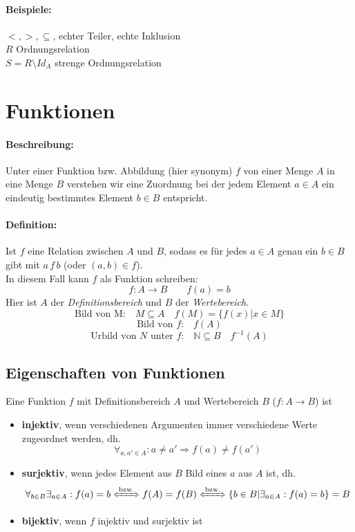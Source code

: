 \documentclass[10pt,a4paper]{article}
\begin{document}
\paragraph{Beispiele:}$<,>,\subseteq$, \glqq echter Teiler\grqq , \glqq echte Inklusion\grqq
\ \\
$R$ Ordnungsrelation\\
$S=R\setminus Id_A$ strenge Ordnungsrelation

\section{Funktionen}
\paragraph{Beschreibung:}Unter einer Funktion bzw. Abbildung (hier synonym) $f$ von einer Menge $A$ in eine Menge $B$ verstehen wir eine Zuordnung bei der jedem Element $a\in A$ ein eindeutig bestimmtes Element $b\in B$ entspricht.
\paragraph{Definition:}Ist $f$ eine Relation zwischen $A$ und $B$, sodass es für jedes $a\in A$ genau ein $b\in B$ gibt mit $a\, f\, b$ (oder $(a,b)\in f$).\\
In diesem Fall kann $f$ als Funktion schreiben:
\[
f:A\rightarrow B \qquad f(a)=b
\]
Hier ist $A$ der \emph{Definitionsbereich} und $B$ der \emph{Wertebereich}.
\[
\text{Bild von M:} \quad M\subseteq A \quad f(M) = \{f(x) | x\in M\}
\]
\[
\text{Bild von $f$:} \quad f(A)
\]
\[
\text{Urbild von $N$ unter $f$:} \quad \mathbb{N}\subseteq B \quad f^{-1}(A)
\]
\subsection{Eigenschaften von Funktionen}
Eine Funktion $f$ mit Definitionsbereich $A$ und Wertebereich $B$ ($f:A\rightarrow B$) ist
\begin{itemize}
\item \textbf{injektiv}, wenn verschiedenen Argumenten immer verschiedene Werte zugeordnet werden, dh.
\[
\forall_{a,a'\in A}: a\neq a' \Rightarrow f(a)\neq f(a')
\]
\item \textbf{surjektiv}, wenn jedes Element aus $B$ Bild eines $a$ aus $A$ ist, dh.
\[
\forall_{b\in B}\exists_{a\in A}: f(a)=b \xLeftrightarrow{\text{bzw.}} f(A)=f(B) \xLeftrightarrow{\text{bzw.}} \{b\in B | \exists_{a\in A}: f(a)=b\}=B
\]
\item \textbf{bijektiv}, wenn $f$ injektiv und surjektiv ist
\end{itemize}
\end{document}
